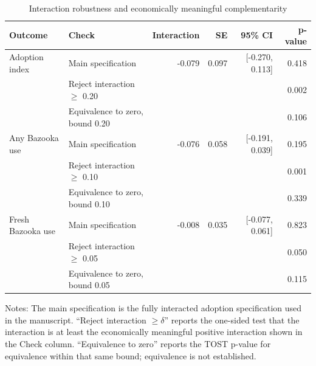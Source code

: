 \begin{table}[!htbp]
\centering
\footnotesize
\caption{Interaction robustness and economically meaningful complementarity}
\label{tab:appendix-interaction-robustness}
\begin{tabular}{llrrrr}
\hline\hline
Outcome & Check & Interaction & SE & 95\% CI & p-value \\
\hline
Adoption index & Main specification & -0.079 & 0.097 & [-0.270, 0.113] & 0.418 \\
 & Reject interaction $\geq$ 0.20 &  &  &  & 0.002 \\
 & Equivalence to zero, bound 0.20 &  &  &  & 0.106 \\
\hline
Any Bazooka use & Main specification & -0.076 & 0.058 & [-0.191, 0.039] & 0.195 \\
 & Reject interaction $\geq$ 0.10 &  &  &  & 0.001 \\
 & Equivalence to zero, bound 0.10 &  &  &  & 0.339 \\
\hline
Fresh Bazooka use & Main specification & -0.008 & 0.035 & [-0.077, 0.061] & 0.823 \\
 & Reject interaction $\geq$ 0.05 &  &  &  & 0.050 \\
 & Equivalence to zero, bound 0.05 &  &  &  & 0.115 \\
\hline\hline
\end{tabular}
\begin{minipage}{0.92\textwidth}
\scriptsize
Notes: The main specification is the fully interacted adoption specification used in the manuscript. ``Reject interaction $\geq \delta$'' reports the one-sided test that the interaction is at least the economically meaningful positive interaction shown in the Check column. ``Equivalence to zero'' reports the TOST p-value for equivalence within that same bound; equivalence is not established.
\end{minipage}
\end{table}
